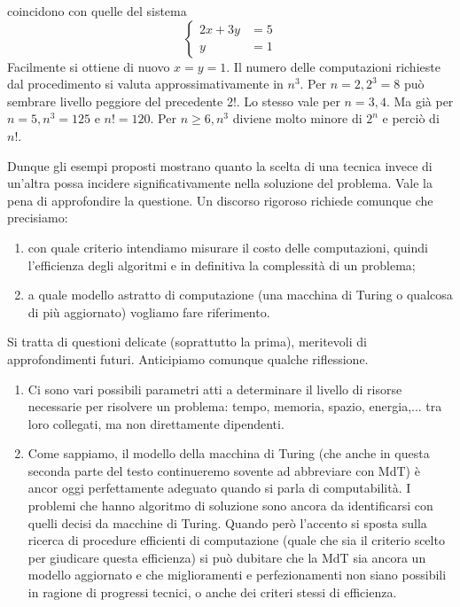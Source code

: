 \begin{enumerate}
          coincidono con quelle del sistema
          $$
              \left\{\begin{array}{cc}
                  2 x+3 y & =5 \\
                  y       & =1
              \end{array}\right.
          $$
          Facilmente si ottiene di nuovo $x=y=1$. Il numero delle computazioni richieste
          dal procedimento si valuta approssimativamente in $n^3$. Per $n=2,2^3=8$ può
          sembrare livello peggiore del precedente 2!. Lo stesso vale per $n=3,4$. Ma già
          per $n=5, n^3=125$ e $n !=120$. Per $n \geq 6, n^3$ diviene molto
          minore di $2^n$ e perciò di $n !$.
\end{enumerate}

Dunque gli esempi proposti mostrano quanto la scelta di una tecnica invece di
un'altra possa incidere significativamente nella soluzione del problema. Vale la
pena di approfondire la questione. Un discorso rigoroso richiede comunque che
precisiamo:

\begin{enumerate}
    \item con quale criterio intendiamo misurare il costo delle
          computazioni, quindi l'efficienza degli algoritmi e in definitiva la complessità
          di un problema;
    \item a quale modello astratto di computazione (una macchina di
          Turing o qualcosa di più aggiornato) vogliamo fare riferimento.
\end{enumerate}

Si tratta di questioni delicate (soprattutto la prima), meritevoli di
approfondimenti futuri. Anticipiamo comunque qualche riflessione.

\begin{enumerate}
    \item Ci sono
          vari possibili parametri atti a determinare il livello di risorse necessarie per
          risolvere un problema: tempo, memoria, spazio, energia,... tra loro collegati,
          ma non direttamente dipendenti.
    \item Come sappiamo, il modello della macchina di
          Turing (che anche in questa seconda parte del testo continueremo sovente ad
          abbreviare con MdT) è ancor oggi perfettamente adeguato quando si parla di
          computabilità. I problemi che hanno algoritmo di soluzione sono ancora da
          identificarsi con quelli decisi da macchine di Turing. Quando però l'accento si
          sposta sulla ricerca di procedure efficienti di computazione (quale che sia il
          criterio scelto per giudicare questa efficienza) si può dubitare che la MdT sia
          ancora un modello aggiornato e che miglioramenti e perfezionamenti non siano
          possibili in ragione di progressi tecnici, o anche dei criteri stessi di
          efficienza.
\end{enumerate}

